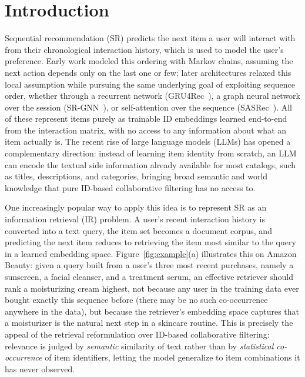 \documentclass[runningheads]{llncs}
\begin{document}
\section{Introduction}
\label{sec:intro}

Sequential recommendation (SR) predicts the next item a user will interact with from their chronological interaction history, which is used to model the user's preference. Early work modeled this ordering with Markov chains, assuming the next action depends only on the last one or few; later architectures relaxed this local assumption while pursuing the same underlying goal of exploiting sequence order, whether through a recurrent network (GRU4Rec~\cite{hidasi2016}), a graph neural network over the session (SR-GNN~\cite{wu2019}), or self-attention over the sequence (SASRec~\cite{kang2018}). All of these represent items purely as trainable ID embeddings learned end-to-end from the interaction matrix, with no access to any information about what an item actually is. The recent rise of large language models (LLMs) has opened a complementary direction: instead of learning item identity from scratch, an LLM can encode the textual side information already available for most catalogs, such as titles, descriptions, and categories, bringing broad semantic and world knowledge that pure ID-based collaborative filtering has no access to.

One increasingly popular way to apply this idea is to represent SR as an information retrieval (IR) problem. A user's recent interaction history is converted into a text query, the item set becomes a document corpus, and predicting the next item reduces to retrieving the item most similar to the query in a learned embedding space. Figure~\ref{fig:example}(a) illustrates this on Amazon Beauty: given a query built from a user's three most recent purchases, namely a sunscreen, a facial cleanser, and a treatment serum, an effective retriever should rank a moisturizing cream highest, not because any user in the training data ever bought exactly this sequence before (there may be no such co-occurrence anywhere in the data), but because the retriever's embedding space captures that a moisturizer is the natural next step in a skincare routine. This is precisely the appeal of the retrieval reformulation over ID-based collaborative filtering: relevance is judged by \emph{semantic} similarity of text rather than by \emph{statistical co-occurrence} of item identifiers, letting the model generalize to item combinations it has never observed.
\end{document}
